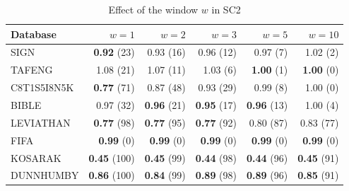 \begin{table}[!htbp]\centering
\caption{Effect of the window $w$ in SC2}\label{tab:sc2_window}
\begin{tabular*}{\textwidth}{@{\extracolsep\fill}lrrrrr}\toprule
Database & $w=1$ & $w=2$ & $w=3$ & $w=5$ & $w=10$ \\\midrule
SIGN & \textbf{0.92} (23) & 0.93 (16) & 0.96 (12) & 0.97 (7) & 1.02 (2) \\
TAFENG & 1.08 (21) & 1.07 (11) & 1.03 (6) & \textbf{1.00} (1) & \textbf{1.00} (0) \\
C8T1S5I8N5K & \textbf{0.77} (71) & 0.87 (48) & 0.93 (29) & 0.99 (8) & 1.00 (0) \\
BIBLE & 0.97 (32) & \textbf{0.96} (21) & \textbf{0.95} (17) & \textbf{0.96} (13) & 1.00 (4) \\
LEVIATHAN & \textbf{0.77} (98) & \textbf{0.77} (95) & \textbf{0.77} (92) & 0.80 (87) & 0.83 (77) \\
FIFA & \textbf{0.99} (0) & \textbf{0.99} (0) & \textbf{0.99} (0) & \textbf{0.99} (0) & \textbf{0.99} (0) \\
KOSARAK & \textbf{0.45} (100) & \textbf{0.45} (99) & \textbf{0.44} (98) & \textbf{0.44} (96) & \textbf{0.45} (91) \\
DUNNHUMBY & \textbf{0.86} (100) & \textbf{0.84} (99) & \textbf{0.89} (98) & \textbf{0.89} (96) & \textbf{0.85} (91) \\
\bottomrule\end{tabular*}
\end{table}
